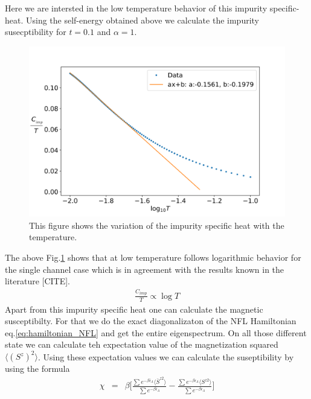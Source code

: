 \documentclass[reprint,prb,superscriptaddress]{revtex4-1}
\begin{document}
Here we are intersted in the low temperature behavior of this impurity specific-heat. Using the self-energy obtained above we calculate the impurity susecptibility for $t=0.1$ and $\alpha=1$. 
\begin{figure}
\centering
\includegraphics[scale=0.36]{plt/FINAL_fitted_Cv_t_0p1.png}
\caption{This figure shows the variation of the impurity specific heat with the temperature.}
\label{fig:Cv_imp}
\end{figure}
The above Fig.\ref{fig:Cv_imp} shows that at low temperature follows logarithmic behavior for the single channel case which is in agreement with the results known in the literature [CITE].
\begin{eqnarray}
\frac{C_{imp}}{T} \propto \log T
\end{eqnarray}
Apart from this impurity specific heat one can calculate the magnetic susceptibilty. For that we do the exact diagonalizaton of the NFL Hamiltonian eq.\eqref{eq:hamiltonian_NFL} and get the entire eigenspectrum. On all those different state we can calculate teh expectation value of the magnetization squared $\langle (S^z)^2 \rangle$. Using these expectation values we can calculate the suseptibility by using the formula
\begin{eqnarray}
\chi &=& \beta\bigg[\frac{\sum e^{-\beta \bar{\epsilon}_{\Lambda}} \langle \bar{S}^{z2} \rangle}{\sum e^{-\beta \bar{\epsilon}_{\Lambda}} } -\frac{\sum e^{-\beta \epsilon_{\Lambda}} \langle S^{z2 }\rangle }{\sum e^{-\beta \epsilon_{\Lambda}} } \bigg] 
\end{eqnarray}
\end{document}
